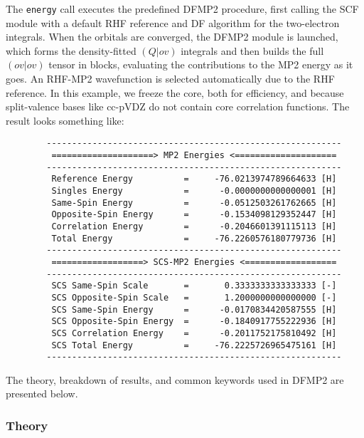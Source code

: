 The \texttt{energy} call executes the predefined DFMP2 procedure, first calling
the SCF module with a default RHF reference and DF algorithm for the
two-electron integrals. When the orbitals are converged, the DFMP2 module is
launched, which forms the density-fitted $(Q|ov)$ integrals and then builds the
full $(ov|ov)$ tensor in blocks, evaluating the contributions to the MP2 energy
as it goes. An RHF-MP2 wavefunction is selected automatically due to the RHF
reference. In this example, we freeze the core, both for efficiency, and
because split-valence bases like cc-pVDZ do not contain core correlation
functions. The result looks something like:
\begin{verbatim}
        ----------------------------------------------------------
         ====================> MP2 Energies <====================
        ----------------------------------------------------------
         Reference Energy          =     -76.0213974789664633 [H]
         Singles Energy            =      -0.0000000000000001 [H]
         Same-Spin Energy          =      -0.0512503261762665 [H]
         Opposite-Spin Energy      =      -0.1534098129352447 [H]
         Correlation Energy        =      -0.2046601391115113 [H]
         Total Energy              =     -76.2260576180779736 [H]
        ----------------------------------------------------------
         ==================> SCS-MP2 Energies <==================
        ----------------------------------------------------------
         SCS Same-Spin Scale       =       0.3333333333333333 [-]
         SCS Opposite-Spin Scale   =       1.2000000000000000 [-]
         SCS Same-Spin Energy      =      -0.0170834420587555 [H]
         SCS Opposite-Spin Energy  =      -0.1840917755222936 [H]
         SCS Correlation Energy    =      -0.2011752175810492 [H]
         SCS Total Energy          =     -76.2225726965475161 [H]
        ----------------------------------------------------------
\end{verbatim}
The theory, breakdown of results, and common keywords used in DFMP2 are presented below. 

\subsubsection{Theory}

